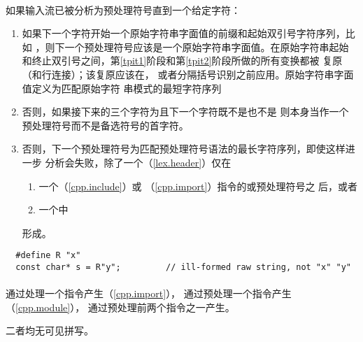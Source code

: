 \paragraph{} %
如果输入流已被分析为预处理符号直到一个给定字符：
\begin{enumerate}
  \item 如果下一个字符开始一个原始字符串字面值的前缀和起始双引号字符序列，比如
        ，则下一个预处理符号应该是一个原始字符串字面值。在原始字符串起始
        和终止双引号之间，第\ref{tpit1}阶段和第\ref{tpit2}阶段所做的所有变换都被
        复原（和行连接）；该复原应该在，
        或者分隔括号识别之前应用。原始字符串字面值定义为匹配原始字符
        串模式的最短字符序列\par
        \mbox{}
  \item 否则，如果接下来的三个字符为\tm{<::}且下一个字符既不是\tm{:}也不是\tm{<}
        则\tm{<}本身当作一个预处理符号而不是备选符号\tm{<:}的首字符。
  \item 否则，下一个预处理符号为匹配预处理符号语法的最长字符序列，即使这样进一步
        分析会失败，除了一个（\ref{lex.header}）仅在
        \begin{enumerate}
          \item 一个（\ref{cpp.include}）或
                （\ref{cpp.import}）指令的或预处理符号之
                后，或者
          \item 一个中
        \end{enumerate}
        形成。
\end{enumerate}

\begin{example} %
  \begin{lstlisting}
  #define R "x"
  const char* s = R"y";         // ill-formed raw string, not "x" "y"
  \end{lstlisting}
\end{example}

\paragraph{} %
通过处理一个指令产生（\ref{cpp.import}），
通过预处理一个指令产生（\ref{cpp.module}），
通过预处理前两个指令之一产生。

\begin{note} %
  二者均无可见拼写。
\end{note}

